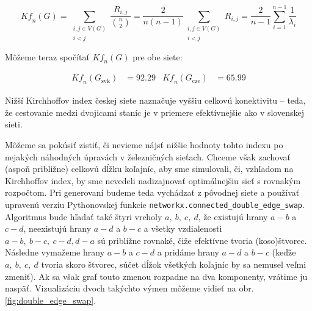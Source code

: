 \documentclass[main.tex]{subfiles}
\begin{document}
\begin{equation*}
	\mathit{Kf}_n(G) = \sum_{\substack{i, j \in V(G) \\ i < j}} \frac{R_{i,j}}{\binom{n}{2}} = \frac{2}{n(n-1)} \sum_{\substack{i, j \in V(G) \\ i < j}} R_{i,j} = \frac{2}{n-1}\sum_{i=1}^{n-1} \frac{1}{\lambda_i}
\end{equation*}

Môžeme teraz spočítať $\mathit{Kf}_n(G)$ pre obe siete:

\begin{align*}
		\mathit{Kf}_n(G_{\text{svk}}) &= 92.29 & \mathit{Kf}_n(G_{\text{cze}}) &= 65.99
\end{align*}

Nižší Kirchhoffov index českej siete naznačuje vyššiu celkovú konektivitu -- teda, že cestovanie medzi dvojicami staníc je v priemere efektívnejšie ako v slovenskej sieti.

Môžeme sa pokúsiť zistiť, či nevieme nájsť nižšie hodnoty tohto indexu po nejakých náhodných úpravách v železničných sieťach. Chceme však zachovať (aspoň približne) celkovú dĺžku koľajníc, aby sme simulovali, či, vzhľadom na Kirchhoffov index, by sme nevedeli nadizajnovať optimálnejšiu sieť s rovnakým rozpočtom. Pri generovaní budeme teda vychádzať z pôvodnej siete a používať upravenú verziu Pythonovskej funkcie \verb*|networkx.connected_double_edge_swap|. Algoritmus bude hľadať také štyri vrcholy $a,~b,~c,~d$, že existujú hrany $a-b$ a $c-d$, neexistujú hrany $a-d$ a $b-c$ a všetky vzdialenosti $a-b,~b-c,~c-d,d-a$ sú približne rovnaké, čiže efektívne tvoria (koso)štvorec. Následne vymažeme hrany $a-b$ a $c-d$ a pridáme hrany $a-d$ a $b-c$ (keďže $a,~b,~c,~d$ tvoria skoro štvorec, súčet dĺžok všetkých koľajníc by sa nemusel veľmi zmeniť). Ak sa však graf touto zmenou rozpadne na dva komponenty, vrátime ju naspäť.  Vizualizáciu dvoch takýchto výmen môžeme vidieť na obr. \ref{fig:double_edge_swap}.
\end{document}
